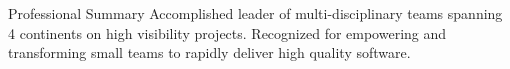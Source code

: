 \documentclass{resume} %
\begin{document}
\vspace{1em}

\begin{rSection}{Professional Summary}
Accomplished leader of multi-disciplinary teams spanning 4
continents on high visibility projects. Recognized for
empowering and transforming small teams to rapidly deliver high quality software.
\end{rSection}

\end{document}
